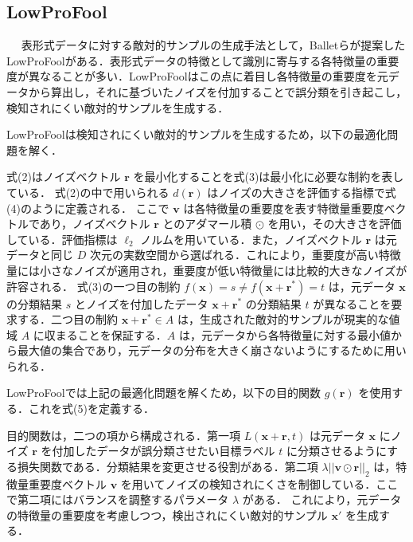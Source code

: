 \subsection{LowProFool}　%
表形式データに対する敵対的サンプルの生成手法として，Balletらが提案したLowProFool\cite{ballet2019imperceptible}がある．表形式データの特徴として識別に寄与する各特徴量の重要度が異なることが多い．LowProFoolはこの点に着目し各特徴量の重要度を元データから算出し，それに基づいたノイズを付加することで誤分類を引き起こし，検知されにくい敵対的サンプルを生成する．

LowProFoolは検知されにくい敵対的サンプルを生成するため，以下の最適化問題を解く．

式(2)はノイズベクトル $\bm{r}$ を最小化することを式(3)は最小化に必要な制約を表している．
式(2)の中で用いられる $d(\bm{r})$ はノイズの大きさを評価する指標で式(4)のように定義される．
ここで $\bm{v}$ は各特徴量の重要度を表す特徴量重要度ベクトルであり，ノイズベクトル $\bm{r}$ とのアダマール積 $\odot$ を用い，その大きさを評価している．評価指標は $\ell_2$ ノルムを用いている．また，ノイズベクトル $\bm{r}$ は元データと同じ $D$ 次元の実数空間から選ばれる．これにより，重要度が高い特徴量には小さなノイズが適用され，重要度が低い特徴量には比較的大きなノイズが許容される．
式(3)の一つ目の制約 $f(\bm{x}) = s \neq f(\bm{x}+\bm{r}^*) = t$ は，元データ $\bm{x}$ の分類結果 $s$ とノイズを付加したデータ $\bm{x}+\bm{r}^*$ の分類結果 $t$ が異なることを要求する．二つ目の制約 $\bm{x}+\bm{r}^* \in A$ は，生成された敵対的サンプルが現実的な値域 $A$ に収まることを保証する．$A$ は，元データから各特徴量に対する最小値から最大値の集合であり，元データの分布を大きく崩さないようにするために用いられる．

LowProFoolでは上記の最適化問題を解くため，以下の目的関数 $g(\bm{r})$ を使用する．これを式(5)を定義する．


 目的関数は，二つの項から構成される．第一項 $L(\bm{x}+\bm{r}, t)$ は元データ $\bm{x}$ にノイズ $\bm{r}$ を付加したデータが誤分類させたい目標ラベル $t$ に分類させるようにする損失関数である．分類結果を変更させる役割がある．第二項 $\lambda ||\bm{v} \odot \bm{r}||_2$ は，特徴量重要度ベクトル $\bm{v}$ を用いてノイズの検知されにくさを制御している．ここで第二項にはバランスを調整するパラメータ $\lambda$ がある．
 これにより，元データの特徴量の重要度を考慮しつつ，検出されにくい敵対的サンプル $\bm{x}'$ を生成する．

